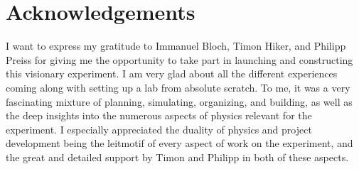 \chapter*{Acknowledgements}

I want to express my gratitude to Immanuel Bloch, Timon Hiker, and Philipp Preiss for giving me the opportunity to take part in launching and constructing this visionary experiment. I am very glad about all the different experiences coming along with setting up a lab from absolute scratch. To me, it was a very fascinating mixture of planning, simulating, organizing, and building, as well as the deep insights into the numerous aspects of physics relevant for the experiment. I especially appreciated the duality of physics and project development being the leitmotif of every aspect of work on the experiment, and the great and detailed support by Timon and Philipp in both of these aspects.

